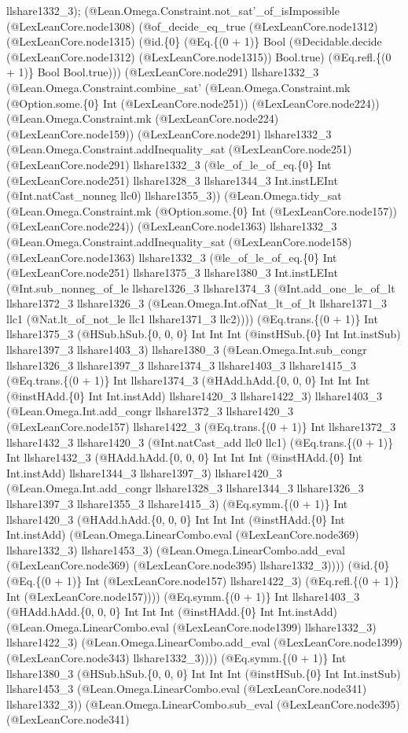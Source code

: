 \documentclass[11pt]{article}
\begin{document}
llshare1332\_3); (@Lean.Omega.Constraint.not\_sat'\_of\_isImpossible (@LexLeanCore.node1308) (@of\_decide\_eq\_true (@LexLeanCore.node1312) (@LexLeanCore.node1315) (@id.\{0\} (@Eq.\{(0 + 1)\} Bool (@Decidable.decide (@LexLeanCore.node1312) (@LexLeanCore.node1315)) Bool.true) (@Eq.refl.\{(0 + 1)\} Bool Bool.true))) (@LexLeanCore.node291) llshare1332\_3 (@Lean.Omega.Constraint.combine\_sat' (@Lean.Omega.Constraint.mk (@Option.some.\{0\} Int (@LexLeanCore.node251)) (@LexLeanCore.node224)) (@Lean.Omega.Constraint.mk (@LexLeanCore.node224) (@LexLeanCore.node159)) (@LexLeanCore.node291) llshare1332\_3 (@Lean.Omega.Constraint.addInequality\_sat (@LexLeanCore.node251) (@LexLeanCore.node291) llshare1332\_3 (@le\_of\_le\_of\_eq.\{0\} Int (@LexLeanCore.node251) llshare1328\_3 llshare1344\_3 Int.instLEInt (@Int.natCast\_nonneg llc0) llshare1355\_3)) (@Lean.Omega.tidy\_sat (@Lean.Omega.Constraint.mk (@Option.some.\{0\} Int (@LexLeanCore.node157)) (@LexLeanCore.node224)) (@LexLeanCore.node1363) llshare1332\_3 (@Lean.Omega.Constraint.addInequality\_sat (@LexLeanCore.node158) (@LexLeanCore.node1363) llshare1332\_3 (@le\_of\_le\_of\_eq.\{0\} Int (@LexLeanCore.node251) llshare1375\_3 llshare1380\_3 Int.instLEInt (@Int.sub\_nonneg\_of\_le llshare1326\_3 llshare1374\_3 (@Int.add\_one\_le\_of\_lt llshare1372\_3 llshare1326\_3 (@Lean.Omega.Int.ofNat\_lt\_of\_lt llshare1371\_3 llc1 (@Nat.lt\_of\_not\_le llc1 llshare1371\_3 llc2)))) (@Eq.trans.\{(0 + 1)\} Int llshare1375\_3 (@HSub.hSub.\{0, 0, 0\} Int Int Int (@instHSub.\{0\} Int Int.instSub) llshare1397\_3 llshare1403\_3) llshare1380\_3 (@Lean.Omega.Int.sub\_congr llshare1326\_3 llshare1397\_3 llshare1374\_3 llshare1403\_3 llshare1415\_3 (@Eq.trans.\{(0 + 1)\} Int llshare1374\_3 (@HAdd.hAdd.\{0, 0, 0\} Int Int Int (@instHAdd.\{0\} Int Int.instAdd) llshare1420\_3 llshare1422\_3) llshare1403\_3 (@Lean.Omega.Int.add\_congr llshare1372\_3 llshare1420\_3 (@LexLeanCore.node157) llshare1422\_3 (@Eq.trans.\{(0 + 1)\} Int llshare1372\_3 llshare1432\_3 llshare1420\_3 (@Int.natCast\_add llc0 llc1) (@Eq.trans.\{(0 + 1)\} Int llshare1432\_3 (@HAdd.hAdd.\{0, 0, 0\} Int Int Int (@instHAdd.\{0\} Int Int.instAdd) llshare1344\_3 llshare1397\_3) llshare1420\_3 (@Lean.Omega.Int.add\_congr llshare1328\_3 llshare1344\_3 llshare1326\_3 llshare1397\_3 llshare1355\_3 llshare1415\_3) (@Eq.symm.\{(0 + 1)\} Int llshare1420\_3 (@HAdd.hAdd.\{0, 0, 0\} Int Int Int (@instHAdd.\{0\} Int Int.instAdd) (@Lean.Omega.LinearCombo.eval (@LexLeanCore.node369) llshare1332\_3) llshare1453\_3) (@Lean.Omega.LinearCombo.add\_eval (@LexLeanCore.node369) (@LexLeanCore.node395) llshare1332\_3)))) (@id.\{0\} (@Eq.\{(0 + 1)\} Int (@LexLeanCore.node157) llshare1422\_3) (@Eq.refl.\{(0 + 1)\} Int (@LexLeanCore.node157)))) (@Eq.symm.\{(0 + 1)\} Int llshare1403\_3 (@HAdd.hAdd.\{0, 0, 0\} Int Int Int (@instHAdd.\{0\} Int Int.instAdd) (@Lean.Omega.LinearCombo.eval (@LexLeanCore.node1399) llshare1332\_3) llshare1422\_3) (@Lean.Omega.LinearCombo.add\_eval (@LexLeanCore.node1399) (@LexLeanCore.node343) llshare1332\_3)))) (@Eq.symm.\{(0 + 1)\} Int llshare1380\_3 (@HSub.hSub.\{0, 0, 0\} Int Int Int (@instHSub.\{0\} Int Int.instSub) llshare1453\_3 (@Lean.Omega.LinearCombo.eval (@LexLeanCore.node341) llshare1332\_3)) (@Lean.Omega.LinearCombo.sub\_eval (@LexLeanCore.node395) (@LexLeanCore.node341) 
\end{document}
